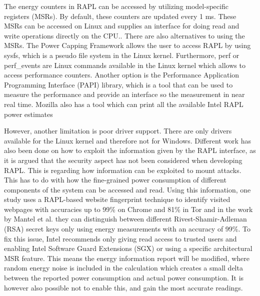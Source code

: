 



The energy counters in RAPL can be accessed by utilizing model-specific registers (MSRs). By default, these counters are updated every 1 ms. These MSRs can be accessed on Linux and supplies an interface for doing read and write operations directly on the CPU.\cite{linux_manual_msr}. There are also alternatives to using the MSRs. The Power Capping Framework allows the user to access RAPL by using sysfs, which is a pseudo file system in the Linux kernel\cite{PowerCappingFramework,RAPL_in_action}. Furthermore, perf or perf\_events are Linux commands available in the Linux kernel which allows to access performance counters.\cite{Perf_events,RAPL_in_action} 
Another option is the Performance Application Programming Interface (PAPI) library, which is a tool that can be used to measure the performance and provide an interface so the measurement in near real time\cite{PAPI}.
Mozilla also has a tool which can print all the available Intel RAPL power estimates\cite{FireFox}\nytafsnit





However, another limitation is poor driver support. There are only drivers available for the Linux kernel and therefore not for Windows.\cite{RAPL_in_action}  Different work has also been done on how to exploit the information given by the RAPL interface, as it is argued that the security aspect has not been considered when developing RAPL\cite[]{Zhang2021}. This is regarding how information can be exploited to mount attacks. This has to do with how the fine-grained power consumption of different components of the system can be accessed and read. Using this information, one study uses a RAPL-based website fingerprint technique to identify visited webpages with accuracies up to 99\% on Chrome and 81\% in Tor\cite[]{Zhang2021} and in the work by Mantel et al.\cite[]{Mantel2018} they can distinguish between different Rivest-Shamir-Adleman (RSA) secret keys only using energy measurements with an accuracy of 99\%. To fix this issue, Intel recommends only giving read access to trusted users and enabling Intel Software Guard Extensions (SGX) or using a specific architectural MSR feature. This means the energy information report will be modified, where random energy noise is included in the calculation which creates a small delta between the reported power consumption and actual power consumption. It is however also possible not to enable this, and gain the most accurate readings.\cite[]{intel_rapl_security}

